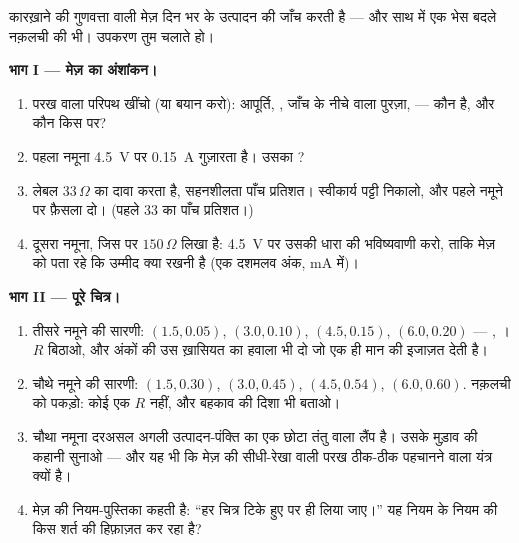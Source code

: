 \begin{problem}\label{pb:g8:ohms-law:1}
कारख़ाने की गुणवत्ता वाली मेज़ दिन भर के उत्पादन की जाँच करती है ---
और साथ में एक भेस बदले नक़लची की भी। उपकरण तुम चलाते हो।

\medskip\noindent\textbf{भाग I --- मेज़ का अंशांकन।}
\begin{enumerate}
  \item परख वाला परिपथ खींचो (या बयान करो): आपूर्ति, , जाँच के
        नीचे वाला पुरज़ा,  --- कौन  है, और कौन
        किस पर?
  \item पहला नमूना \qty{4.5}{V} पर \qty{0.15}{A} गुज़ारता है। उसका
        ?
  \item लेबल $33\,\Omega$ का दावा करता है, सहनशीलता पाँच प्रतिशत।
        स्वीकार्य पट्टी निकालो, और पहले नमूने पर फ़ैसला दो। (पहले
        $33$ का पाँच प्रतिशत।)
  \item दूसरा नमूना, जिस पर $150\,\Omega$ लिखा है: \qty{4.5}{V} पर
        उसकी धारा की भविष्यवाणी करो, ताकि मेज़ को पता रहे कि उम्मीद
        क्या रखनी है (एक दशमलव अंक, \unit{mA} में)।
\end{enumerate}

\medskip\noindent\textbf{भाग II --- पूरे चित्र।}
\begin{enumerate}[resume]
  \item तीसरे नमूने की सारणी: $(1.5, 0.05)$, $(3.0, 0.10)$,
        $(4.5, 0.15)$, $(6.0, 0.20)$ --- , । $R$
        बिठाओ, और अंकों की उस ख़ासियत का हवाला भी दो जो एक ही मान की
        इजाज़त देती है।
  \item चौथे नमूने की सारणी: $(1.5, 0.30)$, $(3.0, 0.45)$,
        $(4.5, 0.54)$, $(6.0, 0.60)$. नक़लची को पकड़ो: कोई एक $R$
        नहीं, और बहकाव की दिशा भी बताओ।
  \item चौथा नमूना दरअसल अगली उत्पादन-पंक्ति का एक छोटा तंतु वाला
        लैंप है। उसके मुड़ाव की कहानी सुनाओ --- और यह भी कि मेज़ की
        सीधी-रेखा वाली परख ठीक-ठीक  पहचानने वाला यंत्र
        क्यों है।
  \item मेज़ की नियम-पुस्तिका कहती है: ``हर चित्र टिके हुए  पर ही
        लिया जाए।'' यह नियम  के नियम की किस शर्त की हिफ़ाज़त कर रहा
        है?
\end{enumerate}


\end{problem}
